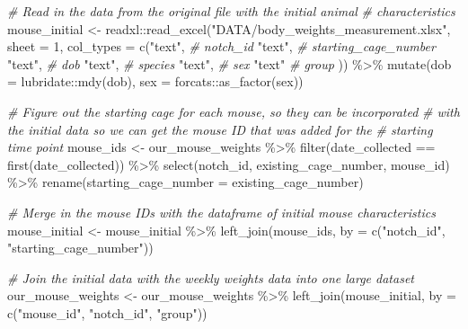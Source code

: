 \documentclass[
]{book}
\newenvironment{Shaded}{\begin{snugshade}}{\end{snugshade}}
\newcommand{\AttributeTok}[1]{\textcolor[rgb]{0.77,0.63,0.00}{#1}}
\newcommand{\CommentTok}[1]{\textcolor[rgb]{0.56,0.35,0.01}{\textit{#1}}}
\newcommand{\DecValTok}[1]{\textcolor[rgb]{0.00,0.00,0.81}{#1}}
\newcommand{\FunctionTok}[1]{\textcolor[rgb]{0.00,0.00,0.00}{#1}}
\newcommand{\NormalTok}[1]{#1}
\newcommand{\OtherTok}[1]{\textcolor[rgb]{0.56,0.35,0.01}{#1}}
\newcommand{\SpecialCharTok}[1]{\textcolor[rgb]{0.00,0.00,0.00}{#1}}
\newcommand{\StringTok}[1]{\textcolor[rgb]{0.31,0.60,0.02}{#1}}
\begin{document}
\begin{Shaded}
\begin{Highlighting}[]
\CommentTok{\# Read in the data from the original file with the initial animal }
\CommentTok{\# characteristics}
\NormalTok{mouse\_initial }\OtherTok{\textless{}{-}}\NormalTok{ readxl}\SpecialCharTok{::}\FunctionTok{read\_excel}\NormalTok{(}\StringTok{"DATA/body\_weights\_measurement.xlsx"}\NormalTok{, }
                                      \AttributeTok{sheet =} \DecValTok{1}\NormalTok{, }
                                      \AttributeTok{col\_types =} \FunctionTok{c}\NormalTok{(}\StringTok{"text"}\NormalTok{, }\CommentTok{\# notch\_id}
                                                    \StringTok{"text"}\NormalTok{, }\CommentTok{\# starting\_cage\_number}
                                                    \StringTok{"text"}\NormalTok{, }\CommentTok{\# dob}
                                                    \StringTok{"text"}\NormalTok{, }\CommentTok{\# species}
                                                    \StringTok{"text"}\NormalTok{, }\CommentTok{\# sex}
                                                    \StringTok{"text"} \CommentTok{\# group}
\NormalTok{                                                    )) }\SpecialCharTok{\%\textgreater{}\%}
  \FunctionTok{mutate}\NormalTok{(}\AttributeTok{dob =}\NormalTok{ lubridate}\SpecialCharTok{::}\FunctionTok{mdy}\NormalTok{(dob), }
         \AttributeTok{sex =}\NormalTok{ forcats}\SpecialCharTok{::}\FunctionTok{as\_factor}\NormalTok{(sex))}

\CommentTok{\# Figure out the starting cage for each mouse, so they can be incorporated}
\CommentTok{\# with the initial data so we can get the mouse ID that was added for the }
\CommentTok{\# starting time point}
\NormalTok{mouse\_ids }\OtherTok{\textless{}{-}}\NormalTok{ our\_mouse\_weights }\SpecialCharTok{\%\textgreater{}\%} 
  \FunctionTok{filter}\NormalTok{(date\_collected }\SpecialCharTok{==} \FunctionTok{first}\NormalTok{(date\_collected)) }\SpecialCharTok{\%\textgreater{}\%} 
  \FunctionTok{select}\NormalTok{(notch\_id, existing\_cage\_number, mouse\_id) }\SpecialCharTok{\%\textgreater{}\%} 
  \FunctionTok{rename}\NormalTok{(}\AttributeTok{starting\_cage\_number =}\NormalTok{ existing\_cage\_number)}

\CommentTok{\# Merge in the mouse IDs with the dataframe of initial mouse characteristics}
\NormalTok{mouse\_initial }\OtherTok{\textless{}{-}}\NormalTok{ mouse\_initial }\SpecialCharTok{\%\textgreater{}\%} 
  \FunctionTok{left\_join}\NormalTok{(mouse\_ids, }\AttributeTok{by =} \FunctionTok{c}\NormalTok{(}\StringTok{"notch\_id"}\NormalTok{, }\StringTok{"starting\_cage\_number"}\NormalTok{))}

\CommentTok{\# Join the initial data with the weekly weights data into one large dataset}
\NormalTok{our\_mouse\_weights }\OtherTok{\textless{}{-}}\NormalTok{ our\_mouse\_weights }\SpecialCharTok{\%\textgreater{}\%} 
  \FunctionTok{left\_join}\NormalTok{(mouse\_initial, }\AttributeTok{by =} \FunctionTok{c}\NormalTok{(}\StringTok{"mouse\_id"}\NormalTok{, }\StringTok{"notch\_id"}\NormalTok{, }\StringTok{"group"}\NormalTok{))}
\end{Highlighting}
\end{Shaded}
\end{document}

